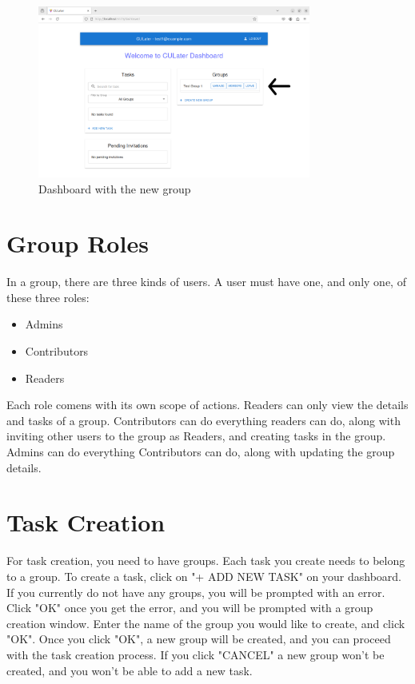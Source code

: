 \documentclass{scrreprt}
\begin{document}
\begin{figure}[htbp]
        \centering
        \includegraphics[width=0.8\textwidth]{working_group_dashboard_after_creation_edited.png}
	\caption{Dashboard with the new group}
	\label{fig:my_label}
\end{figure}

\chapter{Group Roles}
In a group, there are three kinds of users. A user must have one, and only one, of these three roles:

\begin{itemize}
	\item Admins
	\item Contributors
	\item Readers
\end{itemize}

Each role comens with its own scope of actions. Readers can only view the details and tasks of a group. Contributors can do everything readers can do, along with inviting other users to the group as Readers, and creating tasks in the group. Admins can do everything Contributors can do, along with updating the group details.

\chapter{Task Creation}

For task creation, you need to have groups. Each task you create needs to belong to a group. To create a task, click on "+ ADD NEW TASK" on your dashboard. If you currently do not have any groups, you will be prompted with an error. Click "OK" once you get the error, and you will be prompted with a group creation window. Enter the name of the group you would like to create, and click "OK". Once you click "OK", a new group will be created, and you can proceed with the task creation process. If you click "CANCEL" a new group won't be created, and you won't be able to add a new task.\\
\end{document}
